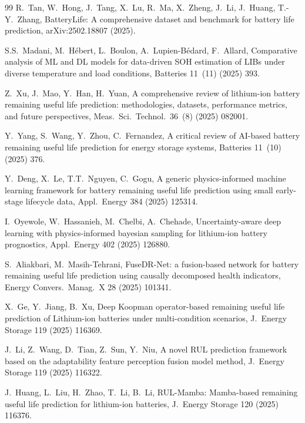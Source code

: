 \begin{thebibliography}{99}
R.~Tan, W.~Hong, J.~Tang, X.~Lu, R.~Ma, X.~Zheng, J.~Li, J.~Huang, T.-Y.~Zhang,
BatteryLife: A comprehensive dataset and benchmark for battery life prediction,
arXiv:2502.18807 (2025).

S.S.~Madani, M.~H\'{e}bert, L.~Boulon, A.~Lupien-B\'{e}dard, F.~Allard,
Comparative analysis of ML and DL models for data-driven SOH estimation of LIBs under diverse temperature and load conditions,
Batteries 11~(11) (2025) 393.

Z.~Xu, J.~Mao, Y.~Han, H.~Yuan,
A comprehensive review of lithium-ion battery remaining useful life prediction: methodologies, datasets, performance metrics, and future perspectives,
Meas.\ Sci.\ Technol.\ 36~(8) (2025) 082001.

Y.~Yang, S.~Wang, Y.~Zhou, C.~Fernandez,
A critical review of AI-based battery remaining useful life prediction for energy storage systems,
Batteries 11~(10) (2025) 376.

Y.~Deng, X.~Le, T.T.~Nguyen, C.~Gogu,
A generic physics-informed machine learning framework for battery remaining useful life prediction using small early-stage lifecycle data,
Appl.\ Energy 384 (2025) 125314.

I.~Oyewole, W.~Hassanieh, M.~Chelbi, A.~Chehade,
Uncertainty-aware deep learning with physics-informed bayesian sampling for lithium-ion battery prognostics,
Appl.\ Energy 402 (2025) 126880.

S.~Aliakbari, M.~Masih-Tehrani,
FuseDR-Net: a fusion-based network for battery remaining useful life prediction using causally decomposed health indicators,
Energy Convers.\ Manag.\ X 28 (2025) 101341.

X.~Ge, Y.~Jiang, B.~Xu,
Deep Koopman operator-based remaining useful life prediction of Lithium-ion batteries under multi-condition scenarios,
J.\ Energy Storage 119 (2025) 116369.

J.~Li, Z.~Wang, D.~Tian, Z.~Sun, Y.~Niu,
A novel RUL prediction framework based on the adaptability feature perception fusion model method,
J.\ Energy Storage 119 (2025) 116322.

J.~Huang, L.~Liu, H.~Zhao, T.~Li, B.~Li,
RUL-Mamba: Mamba-based remaining useful life prediction for lithium-ion batteries,
J.\ Energy Storage 120 (2025) 116376.


\end{thebibliography}
